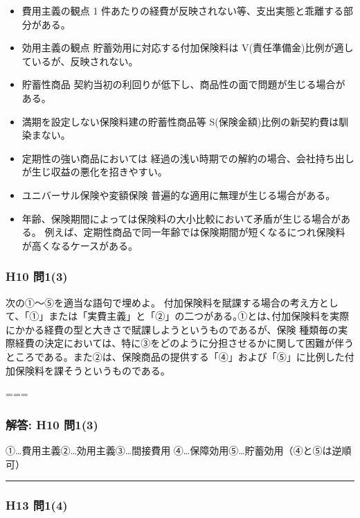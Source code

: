 \documentclass[]{article}
\begin{document}
\begin{itemize}
\tightlist
\item
  費用主義の観点 1
  件あたりの経費が反映されない等、支出実態と乖離する部分がある。
\item
  効用主義の観点 貯蓄効用に対応する付加保険料は
  V(責任準備金)比例が適しているが、反映されない。
\item
  貯蓄性商品
  契約当初の利回りが低下し、商品性の面で問題が生じる場合がある。
\item
  満期を設定しない保険料建の貯蓄性商品等
  S(保険金額)比例の新契約費は馴染まない。
\item
  定期性の強い商品においては
  経過の浅い時期での解約の場合、会社持ち出しが生じ収益の悪化を招きやすい。
\item
  ユニバーサル保険や変額保険 普遍的な適用に無理が生じる場合がある。
\item
  年齢、保険期間によっては保険料の大小比較において矛盾が生じる場合がある。
  例えば、定期性商品で同一年齢では保険期間が短くなるにつれ保険料が高くなるケースがある。
\end{itemize}

\hypertarget{h10-ux554f13}{%
\subsubsection{H10 問1(3)}\label{h10-ux554f13}}

次の①～⑤を適当な語句で埋めよ。
付加保険料を賦課する場合の考え方として、「①」または「実費主義」と「②」の二つがある｡①とは､付加保険料を実際にかかる経費の型と大きさで賦課しようというものであるが、保険
種類毎の実際経費の決定においては、特に③をどのように分担させるかに関して困難が伴うところである。また②は、保険商品の提供する「④」および「⑤」に比例した付加保険料を課そうというものである。

===

\hypertarget{ux89e3ux7b54-h10-ux554f13}{%
\subsubsection{解答: H10 問1(3)}\label{ux89e3ux7b54-h10-ux554f13}}

①\ldots 費用主義②\ldots 効用主義③\ldots 間接費用
④\ldots 保障効用⑤\ldots 貯蓄効用（④と⑤は逆順可）

\begin{center}\rule{0.5\linewidth}{0.5pt}\end{center}

\hypertarget{h13-ux554f14}{%
\subsubsection{H13 問1(4)}\label{h13-ux554f14}}
\end{document}
